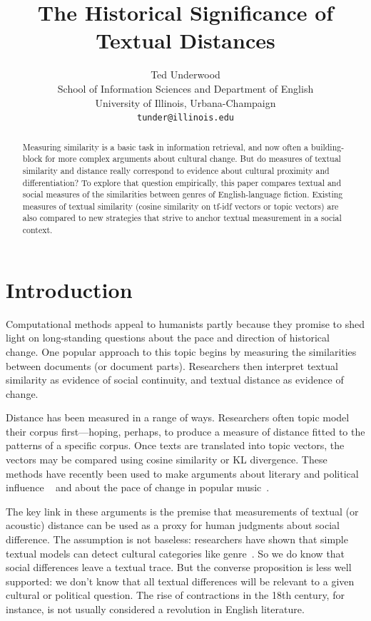 \documentclass[11pt]{article}
\title{The Historical Significance of Textual Distances}
\author{Ted Underwood \\
  School of Information Sciences and Department of English \\
  University of Illinois, Urbana-Champaign \\
  {\tt tunder@illinois.edu} \\}
\date{}
\begin{document}
\maketitle
\begin{abstract}
  Measuring similarity is a basic task in information retrieval, and now often a building-block for more complex arguments about cultural change. But do measures of textual similarity and distance really correspond to evidence about cultural proximity and differentiation? To explore that question empirically, this paper compares textual and social measures of the similarities between genres of English-language fiction. Existing measures of textual similarity (cosine similarity on tf-idf vectors or topic vectors) are also compared to new strategies that strive to anchor textual measurement in a social context.  
  \end{abstract}

\section{Introduction}
\label{intro}


Computational methods appeal to humanists partly because they promise to shed light on long-standing questions about the pace and direction of historical change. One popular approach to this topic begins by measuring the similarities between documents (or document parts). Researchers then interpret textual similarity as evidence of social continuity, and textual distance as evidence of change.

Distance has been measured in a range of ways. Researchers often topic model their corpus first---hoping, perhaps, to produce a measure of distance fitted to the patterns of a specific corpus. Once texts are translated into topic vectors, the vectors may be compared using cosine similarity or KL divergence. These methods have recently been used to make arguments about literary and political influence ~\cite{jockers:macroanalysis,barron:individuals} and about the pace of change in popular music~\cite{mauch:evolution}.

The key link in these arguments is the premise that measurements of textual (or acoustic) distance can be used as a proxy for human judgments about social difference. The assumption is not baseless: researchers have shown that simple textual models can detect cultural categories like genre~\cite{kessler:automatic,kim:genre}. So we do know that social differences leave a textual trace. But the converse proposition is less well supported: we don't know that all textual differences will be relevant to a given cultural or political question. The rise of contractions in the 18th century, for instance, is not usually considered a revolution in English literature.
\end{document}
